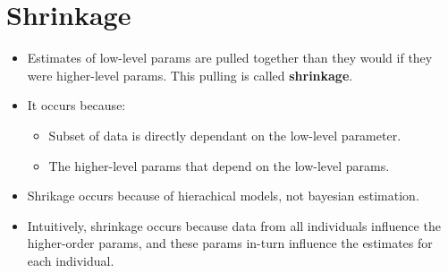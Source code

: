 \documentclass{article}
\begin{document}
    \section{Shrinkage}
    \begin{itemize}
        \item Estimates of low-level params are pulled together than they would if they were higher-level params. This pulling is called \textbf{shrinkage}.
        \item It occurs because:
            \begin{itemize}
                \item Subset of data is directly dependant on the low-level parameter.
                \item The higher-level params that depend on the low-level params.
            \end{itemize}
        \item Shrikage occurs because of hierachical models, not bayesian estimation.
        \item Intuitively, shrinkage occurs because data from all individuals influence the higher-order params, and these params in-turn influence the estimates for each individual.
    \end{itemize}
\end{document}
